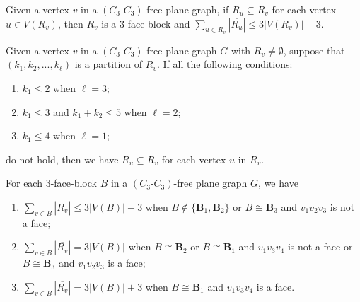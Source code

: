 \documentclass[10pt,a4paper]{amsart}
\begin{document}
\begin{lemma}\label{R-v}
    Given a vertex $v$ in a $(C_3\text{-}C_3)$-free plane graph, if $R_u\subseteq R_v$ for each vertex $u\in V(R_v)$, then $R_v$ is a $3$-face-block and $\sum_{u \in R_v}|\overline{R_u}| \leq 3|V(R_v)|-3$.
\end{lemma}

\begin{lemma}\label{partition}
    Given a vertex $v$ in a $(C_3\text{-}C_3)$-free plane graph $G$ with $R_v\neq\emptyset$, suppose that $(k_1,k_2,...,k_{\ell})$ is a partition of $R_v$. If all the following conditions: 
    \begin{enumerate}
        \item $k_1\leq 2$ when $\ell=3$;
        \item $k_1\leq 3$ and $k_1+k_2\leq 5$ when $\ell=2$;
        \item $k_1\leq 4$ when $\ell=1$;
    \end{enumerate} 
    do not hold, then we have $R_u \subseteq R_v$ for each vertex $u$ in $R_v$.
\end{lemma}

\begin{lemma}\label{face-block}
    For each $3$-face-block $B$ in a $(C_3\textbf{-}C_3)$-free plane graph $G$, we have  
    \begin{enumerate}
        \item $\sum_{v \in B}|\overline{R_v}| \leq 3|V(B)|-3$ when $B\notin\{\mathbf{B}_1,\mathbf{B}_2\}$ or $B\cong\mathbf{B}_3$ and $v_1v_2v_3$ is not a face;
        \item $\sum_{v \in B}|\overline{R_v}| = 3|V(B)|$ when $B\cong\mathbf{B}_2$ or $B\cong\mathbf{B}_1$ and $v_1v_3v_4$ is not a face or $B\cong\mathbf{B}_3$ and $v_1v_2v_3$ is a face;
        \item $\sum_{v \in B}|\overline{R_v}| = 3|V(B)|+3$ when $B\cong\mathbf{B}_1$ and $v_1v_3v_4$ is a face.
    \end{enumerate}
\end{lemma}
\end{document}

